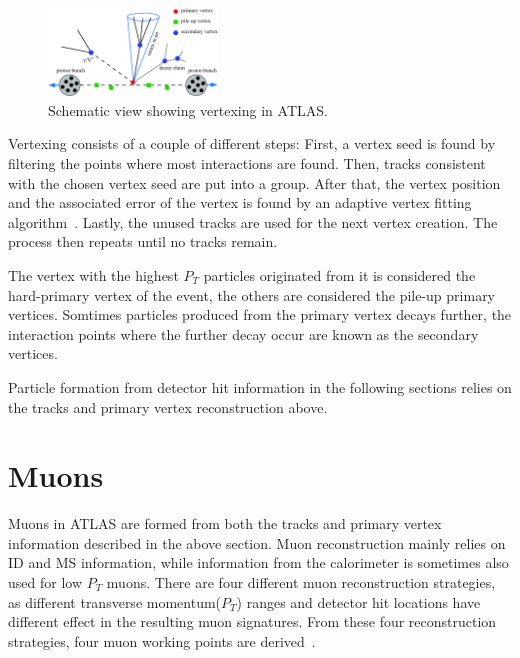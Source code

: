 \begin{figure}[!htb]
    \begin{center}
        \includegraphics[width=0.4\textwidth]{figures/common_ana/Vertex}
        \caption{        
            Schematic view showing vertexing in ATLAS\cite{4774734}.
        }
    \end{center}
\end{figure}

Vertexing consists of a couple of different steps: First, a vertex seed is found by filtering the points where most interactions are found. Then, tracks consistent with the chosen vertex seed are put into a group. After that, the vertex position and the associated error of the vertex is found by an adaptive vertex fitting algorithm~\cite{track}. Lastly, the unused tracks are used for the next vertex creation. The process then repeats until no tracks remain. 

The vertex with the highest $P_{T}$ particles originated from it is considered the hard-primary vertex of the event, the others are considered the pile-up primary vertices. Somtimes particles produced from the primary vertex decays further, the interaction points where the further decay occur are known as the secondary vertices.

Particle formation from detector hit information in the following sections relies on the tracks and primary vertex reconstruction above.

\section{Muons}
\label{sec:Muon}
Muons in ATLAS are formed from both the tracks and primary vertex information described in the above section. Muon reconstruction mainly relies on ID and MS information, while information from the calorimeter is sometimes also used for low $P_{T}$ muons. There are four different muon reconstruction strategies, as different transverse momentum($P_{T}$) ranges and detector hit locations have different effect in the resulting muon signatures. From these four reconstruction strategies, four muon working
points are derived~\cite{Aad:2746302}.

